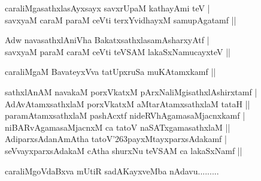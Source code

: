 \begin{entry}
\gl{}
\mng{}
\end{entry}

\begin{entry}
\begin{shl}
caraliMgasathxlasAyxsayx savxrUpaM kathayAmi teV |\\
savxyaM caraM paraM ceVti terxYvidhayxM samupAgatamf ||
\end{shl}
\begin{shl}
Adw navasathxlAniVha BakatxsathxlasamAsharxyAtf |\\
savxyaM paraM caraM ceVti teVSAM lakaSxNamucayxteV ||
\end{shl}
\begin{shl}
caraliMgaM BavateyxVva tatUpxruSa muKAtamxkamf ||
\end{shl}
\end{entry}

\begin{entry}
\begin{shl}
sathxlAnAM navakaM porxVkatxM pArxNaliMgisathxlAshirxtamf |\\
AdAvAtamxsathxlaM porxVkatxM aMtarAtamxsathxlaM tataH ||\\
paramAtamxsathxlaM pashAcxtf nideRVhAgamasaMjacnxkamf |\\
niBARvAgamasaMjacnxM ca tatoV naSATxgamasathxlaM ||\\
AdiparxsAdanAmAtha tatoV{\char'263}payxMtayxparxsAdakamf |\\
seVvayxparxsAdakaM cAtha shurxNu teVSAM ca lakaSxNamf ||
\end{shl}
\end{entry}

\begin{entry}
\gl{}
\begin{shl}
caraliMgoVdaBxva mUtiR sadAKayxveMba nAdavu.........
\end{shl}
\end{entry}

